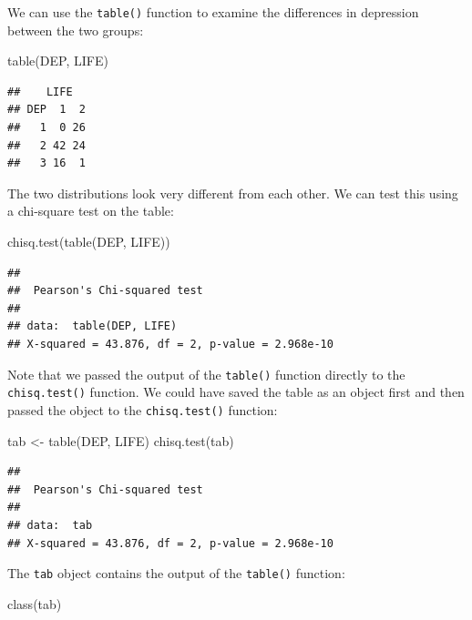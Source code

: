 \documentclass[
  12pt,
]{book}
\newenvironment{Shaded}{\begin{snugshade}}{\end{snugshade}}
\newcommand{\FunctionTok}[1]{\textcolor[rgb]{0.00,0.00,0.00}{#1}}
\newcommand{\NormalTok}[1]{#1}
\newcommand{\OtherTok}[1]{\textcolor[rgb]{0.56,0.35,0.01}{#1}}
\begin{document}
We can use the \texttt{table()} function to examine the differences in depression between the two groups:

\begin{Shaded}
\begin{Highlighting}[]
\FunctionTok{table}\NormalTok{(DEP, LIFE)}
\end{Highlighting}
\end{Shaded}

\begin{verbatim}
##    LIFE
## DEP  1  2
##   1  0 26
##   2 42 24
##   3 16  1
\end{verbatim}

The two distributions look very different from each other. We can test this using a chi-square test on the table:

\begin{Shaded}
\begin{Highlighting}[]
\FunctionTok{chisq.test}\NormalTok{(}\FunctionTok{table}\NormalTok{(DEP, LIFE))}
\end{Highlighting}
\end{Shaded}

\begin{verbatim}
## 
##  Pearson's Chi-squared test
## 
## data:  table(DEP, LIFE)
## X-squared = 43.876, df = 2, p-value = 2.968e-10
\end{verbatim}

\newpage

Note that we passed the output of the \texttt{table()} function directly to the \texttt{chisq.test()} function. We could have saved the table as an object first and then passed the object to the \texttt{chisq.test()} function:

\begin{Shaded}
\begin{Highlighting}[]
\NormalTok{tab }\OtherTok{\textless{}{-}} \FunctionTok{table}\NormalTok{(DEP, LIFE)}
\FunctionTok{chisq.test}\NormalTok{(tab)}
\end{Highlighting}
\end{Shaded}

\begin{verbatim}
## 
##  Pearson's Chi-squared test
## 
## data:  tab
## X-squared = 43.876, df = 2, p-value = 2.968e-10
\end{verbatim}

The \texttt{tab} object contains the output of the \texttt{table()} function:

\begin{Shaded}
\begin{Highlighting}[]
\FunctionTok{class}\NormalTok{(tab)}
\end{Highlighting}
\end{Shaded}
\end{document}
